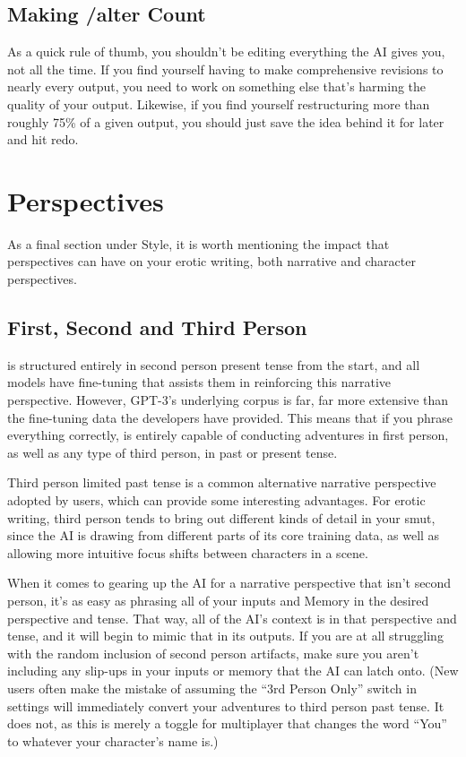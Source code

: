 ﻿\documentclass[Coomer-main.tex]{subfiles}
\begin{document}
\subsection{Making /alter Count}

As a quick rule of thumb, you shouldn't be editing everything the AI gives you, not all the time.
If you find yourself having to make comprehensive revisions to nearly every output, you need to work on something else that's harming the quality of your output.
Likewise, if you find yourself restructuring more than roughly 75\% of a given output, you should just save the idea behind it for later and hit redo.

\section{Perspectives}

As a final section under Style, it is worth mentioning the impact that perspectives can have on your erotic writing, both narrative and character perspectives.

\subsection{First, Second and Third Person}

\aid is structured entirely in second person present tense from the start, and all models have fine-tuning that assists them in reinforcing this narrative perspective.
However, GPT-3's underlying corpus is far, far more extensive than the fine-tuning data the developers have provided.
This means that if you phrase everything correctly, \aid is entirely capable of conducting adventures in first person, as well as any type of third person, in past or present tense.

Third person limited past tense is a common alternative narrative perspective adopted by \aid users, which can provide some interesting advantages.
For erotic writing, third person tends to bring out different kinds of detail in your smut, since the AI is drawing from different parts of its core training data, as well as allowing more intuitive focus shifts between characters in a scene.

When it comes to gearing up the AI for a narrative perspective that isn't second person, it's as easy as phrasing all of your inputs and Memory in the desired perspective and tense.
That way, all of the AI's context is in that perspective and tense, and it will begin to mimic that in its outputs.
If you are at all struggling with the random inclusion of second person artifacts, make sure you aren't including any slip-ups in your inputs or memory that the AI can latch onto. (New users often make the mistake of assuming the “3rd Person Only” switch in settings will immediately convert your adventures to third person past tense.
It does not, as this is merely a toggle for multiplayer that changes the word “You” to whatever your character’s name is.)
\end{document}
